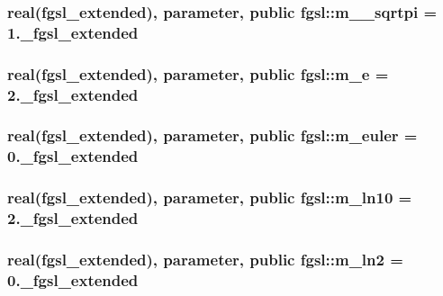 \subsubsection[{m\+\_\+2\+\_\+sqrtpi}]{\setlength{\rightskip}{0pt plus 5cm}real({\bf fgsl\+\_\+extended}), parameter, public fgsl\+::m\+\_\+\_\+sqrtpi = 1.\+\_\+fgsl\+\_\+extended}\label{namespacefgsl_a20272585dc8f0b54e493f4717330469a}
\hypertarget{namespacefgsl_abd883826f3a31d832e0746f37ac56cff}{}
\subsubsection[{m\+\_\+e}]{\setlength{\rightskip}{0pt plus 5cm}real({\bf fgsl\+\_\+extended}), parameter, public fgsl\+::m\+\_\+e = 2.\+\_\+fgsl\+\_\+extended}\label{namespacefgsl_abd883826f3a31d832e0746f37ac56cff}
\hypertarget{namespacefgsl_ab8079b9a6e17b1def176e97feda2a841}{}
\subsubsection[{m\+\_\+euler}]{\setlength{\rightskip}{0pt plus 5cm}real({\bf fgsl\+\_\+extended}), parameter, public fgsl\+::m\+\_\+euler = 0.\+\_\+fgsl\+\_\+extended}\label{namespacefgsl_ab8079b9a6e17b1def176e97feda2a841}
\hypertarget{namespacefgsl_a152b62af261c671c54b99ac278df759d}{}
\subsubsection[{m\+\_\+ln10}]{\setlength{\rightskip}{0pt plus 5cm}real({\bf fgsl\+\_\+extended}), parameter, public fgsl\+::m\+\_\+ln10 = 2.\+\_\+fgsl\+\_\+extended}\label{namespacefgsl_a152b62af261c671c54b99ac278df759d}
\hypertarget{namespacefgsl_a126c02aa2554290ff648243425e03ace}{}
\subsubsection[{m\+\_\+ln2}]{\setlength{\rightskip}{0pt plus 5cm}real({\bf fgsl\+\_\+extended}), parameter, public fgsl\+::m\+\_\+ln2 = 0.\+\_\+fgsl\+\_\+extended}\label{namespacefgsl_a126c02aa2554290ff648243425e03ace}
\hypertarget{namespacefgsl_ae9aff58d6fcadaab60410424796cd713}{}
